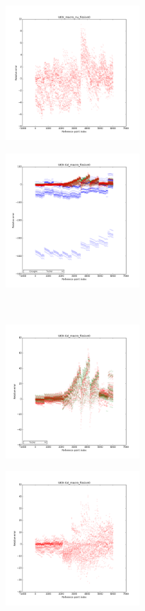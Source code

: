 \begin{center}
\begin{figure}[!h]
		\begin{subfigure}[b]{0.45\textwidth}
				\includegraphics[width=\linewidth,height=5cm]{images/UOX/UOX_macro_nu_fission0_alone.png}
		\end{subfigure}
\end{figure}
\begin{figure}[!h]\ContinuedFloat
		\centering
		\begin{subfigure}[b]{0.45\textwidth}
				\includegraphics[width=\linewidth,height=5cm]{images/UOX-Gd/UOX-Gd_macro_fission0_with_cocagne.png}
		\end{subfigure}
		~
		\begin{subfigure}[b]{0.45\textwidth}
				\includegraphics[width=\linewidth,height=5cm]{images/UOX-Gd/UOX-Gd_macro_fission0.png}
		\end{subfigure}
		\begin{subfigure}[b]{0.45\textwidth}
				\includegraphics[width=\linewidth,height=5cm]{images/UOX-Gd/UOX-Gd_macro_fission0_alone.png}

\end{subfigure}
\end{figure}
\end{center}

